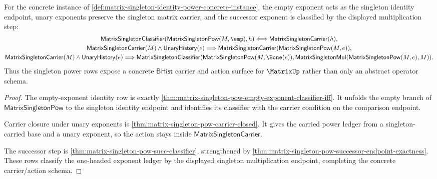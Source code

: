 \begin{theorem}
\label{thm:matrix-singleton-identity-power-law}
For the concrete instance of
\autoref{def:matrix-singleton-identity-power-concrete-instance}, the empty
exponent acts as the singleton identity endpoint, unary exponents preserve the
singleton matrix carrier, and the successor exponent is classified by the
displayed multiplication step:
$$
\begin{gathered}
\mathsf{MatrixSingletonClassifier}
  (\mathsf{MatrixSingletonPow}(M,\emp),h)
\Longleftrightarrow
\mathsf{MatrixSingletonCarrier}(h),\\
\mathsf{MatrixSingletonCarrier}(M)\land\mathsf{UnaryHistory}(e)
\Longrightarrow
\mathsf{MatrixSingletonCarrier}(\mathsf{MatrixSingletonPow}(M,e)),\\
\mathsf{MatrixSingletonCarrier}(M)\land\mathsf{UnaryHistory}(e)
\Longrightarrow
\mathsf{MatrixSingletonClassifier}
  (\mathsf{MatrixSingletonPow}(M,\Eone(e)),
   \mathsf{MatrixSingletonMul}(\mathsf{MatrixSingletonPow}(M,e),M)).
\end{gathered}
$$
Thus the singleton power rows expose a concrete $\mathsf{BHist}$ carrier and
action surface for $\MatrixUp$ rather than only an abstract operator schema.
\end{theorem}
\begin{proof}
The empty-exponent identity row is exactly
\autoref{thm:matrix-singleton-pow-empty-exponent-classifier-iff}. It unfolds
the empty branch of $\mathsf{MatrixSingletonPow}$ to the singleton identity
endpoint and identifies its classifier with the carrier condition on the
comparison endpoint.

Carrier closure under unary exponents is
\autoref{thm:matrix-singleton-pow-carrier-closed}. It gives the carried power
ledger from a singleton-carried base and a unary exponent, so the action stays
inside $\mathsf{MatrixSingletonCarrier}$.

The successor step is
\autoref{thm:matrix-singleton-pow-succ-classifier}, strengthened by
\autoref{thm:matrix-singleton-pow-successor-endpoint-exactness}. These rows
classify the one-headed exponent ledger by the displayed singleton
multiplication endpoint, completing the concrete carrier/action schema.
\end{proof}

